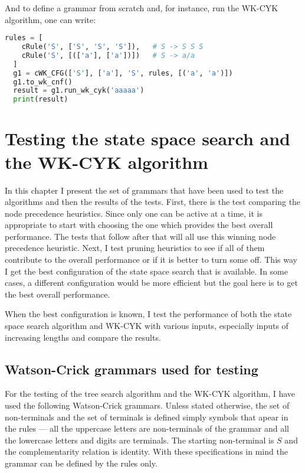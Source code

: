 And to define a grammar from scratch and, for instance, run the WK-CYK algorithm, one can write:
\begin{lstlisting}[language=Python]
  rules = [
    cRule('S', ['S', 'S', 'S']),   # S -> S S S
    cRule('S', [(['a'], ['a'])])   # S -> a/a
  ]
  g1 = cWK_CFG(['S'], ['a'], 'S', rules, [('a', 'a')])
  g1.to_wk_cnf()
  result = g1.run_wk_cyk('aaaaa')
  print(result)
\end{lstlisting}


\chapter{Testing the state space search and the WK-CYK algorithm} \label{chapter:testing}

In this chapter I present the set of grammars that have been used to test the algorithms and then the results of the tests. First, there is the test comparing the node precedence heuristics. Since only one can be active at a time, it is appropriate to start with choosing the one which provides the best overall performance. The tests that follow after that will all use this winning node precedence heuristic. Next, I test pruning heuristics to see if all of them contribute to the overall performance or if it is better to turn some off. This way I get the best configuration of the state space search that is available. In some cases, a different configuration would be more efficient but the goal here is to get the best overall performance.

When the best configuration is known, I test the performance of both the state space search algorithm and WK-CYK with various inputs, especially inputs of increasing lengths and compare the results.

\section{Watson-Crick grammars used for testing}

For the testing of the tree search algorithm and the WK-CYK algorithm, I have used the following Watson-Crick grammars. Unless stated otherwise, the set of non-terminals and the set of terminals is defined simply symbols that apear in the rules --- all the uppercase letters are non-terminals of the grammar and all the lowercase letters and digits are terminals. The starting non-terminal is $S$ and the complementarity relation is identity. With these specifications in mind the grammar can be defined by the rules only.

